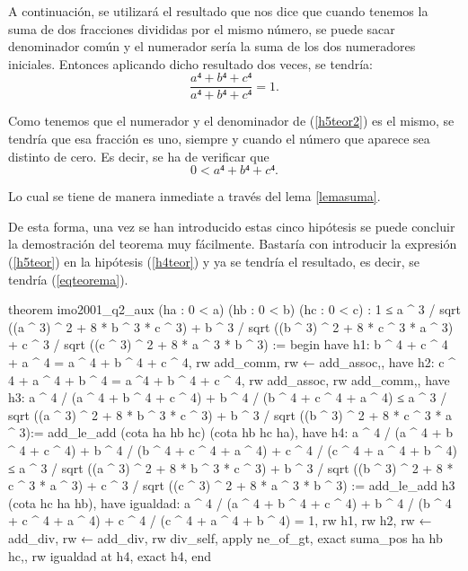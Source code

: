 \begin{demostracion}
\begin{itemize}
    A continuación, se utilizará el resultado que nos dice que
    cuando tenemos la suma de dos fracciones divididas por el mismo
    número, se puede sacar denominador común y el numerador sería la suma
    de los dos numeradores iniciales. Entonces aplicando dicho resultado
    dos veces, se tendría:
    \begin{equation}\label{h5teor2}
      \frac{a⁴+b⁴+c⁴}{a⁴+b⁴+c⁴}=1.
    \end{equation}

    Como tenemos que el numerador y el denominador de (\ref{h5teor2}) es
    el mismo, se tendría que esa fracción es uno, siempre y cuando el
    número que aparece sea distinto de cero. Es decir, se ha de verificar
    que
    \begin{equation}
      0<a⁴+b⁴+c⁴.
    \end{equation}

    Lo cual se tiene de manera inmediate a través del lema \ref{lemasuma}.
  \end{itemize}

  De esta forma, una vez se han introducido estas cinco hipótesis se puede
  concluir la demostración del teorema muy fácilmente. Bastaría con
  introducir la expresión (\ref{h5teor}) en la hipótesis (\ref{h4teor})
  y ya se tendría el resultado, es decir, se tendría (\ref{eqteorema}).
\end{demostracion}

\begin{leancode}
theorem imo2001_q2_aux (ha : 0 < a) (hb : 0 < b) (hc : 0 < c) :
  1 ≤ a ^ 3 / sqrt ((a ^ 3) ^ 2 + 8 * b ^ 3 * c ^ 3) +
      b ^ 3 / sqrt ((b ^ 3) ^ 2 + 8 * c ^ 3 * a ^ 3) +
      c ^ 3 / sqrt ((c ^ 3) ^ 2 + 8 * a ^ 3 * b ^ 3) :=
begin
  have h1: b ^ 4 + c ^ 4 + a ^ 4 = a ^ 4 + b ^ 4 + c ^ 4,
  {rw add_comm,
   rw ← add_assoc,},
  have h2: c ^ 4 + a ^ 4 + b ^ 4 = a ^4 + b ^ 4 + c ^ 4,
  {rw add_assoc,
   rw add_comm,},
  have h3: a ^ 4 / (a ^ 4 + b ^ 4 + c ^ 4) + 
    b ^ 4 / (b ^ 4 + c ^ 4 + a ^ 4) ≤  
    a ^ 3 / sqrt ((a ^ 3) ^ 2 + 8 * b ^ 3 * c ^ 3) + 
    b ^ 3 / sqrt ((b ^ 3) ^ 2 + 8 * c ^ 3 * a ^ 3):= 
    add_le_add (cota ha hb hc) (cota hb hc ha),
  have h4: a ^ 4 / (a ^ 4 + b ^ 4 + c ^ 4) + 
    b ^ 4 / (b ^ 4 + c ^ 4 + a ^ 4) +
    c ^ 4 / (c ^ 4 + a ^ 4 + b ^ 4) ≤  
    a ^ 3 / sqrt ((a ^ 3) ^ 2 + 8 * b ^ 3 * c ^ 3) + 
    b ^ 3 / sqrt ((b ^ 3) ^ 2 + 8 * c ^ 3 * a ^ 3) +
    c ^ 3 / sqrt ((c ^ 3) ^ 2 + 8 * a ^ 3 * b ^ 3) :=
    add_le_add h3 (cota hc ha hb),
  have igualdad: a ^ 4 / (a ^ 4 + b ^ 4 + c ^ 4) + 
    b ^ 4 / (b ^ 4 + c ^ 4 + a ^ 4) +
    c ^ 4 / (c ^ 4 + a ^ 4 + b ^ 4) = 1,
    {rw h1,
     rw h2,
     rw ← add_div,
     rw ← add_div,
     rw div_self,
     apply ne_of_gt,
     exact suma_pos ha hb hc,},
  rw igualdad at h4,
  exact h4,
end
\end{leancode}

